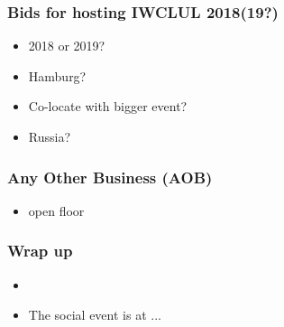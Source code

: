 \documentclass{beamer}
\begin{document}
\begin{frame}
    \frametitle{Bids for hosting IWCLUL 2018(19?)}
    \begin{itemize}
        \item 2018 or 2019?
        \item Hamburg?
        \item Co-locate with bigger event?
        \item Russia?
    \end{itemize}
\end{frame}

\begin{frame}
    \frametitle{Any Other Business (AOB)}
    \begin{itemize}

        \item open floor
    \end{itemize}
\end{frame}

\begin{frame}
    \frametitle{Wrap up}
    \begin{itemize}
        \item
        \item The social event is at ...
    \end{itemize}
\end{frame}
\end{document}
